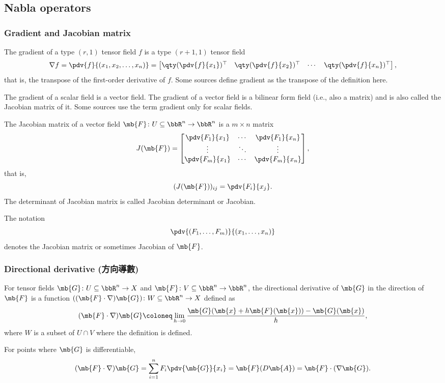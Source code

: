 \documentclass[a4paper,12pt]{report}
\begin{document}
\begin{itemize}
\begin{itemize}
\subsection{Nabla operators}
\subsubsection{Gradient and Jacobian matrix}
The gradient of a type $(r,1)$ tensor field $f$ is a type $(r+1,1)$ tensor field
\[\nabla f = \pdv{f}{(x_1,x_2,\ldots,x_n)} = \begin{bmatrix}\qty(\pdv{f}{x_1})^{\top} & \qty(\pdv{f}{x_2})^{\top} & \cdots  & \qty(\pdv{f}{x_n})^{\top}\end{bmatrix},\]
that is, the transpose of the first-order derivative of $f$. Some sources define gradient as the transpose of the definition here.

The gradient of a scalar field is a vector field. The gradient of a vector field is a bilinear form field (i.e., also a matrix) and is also called the Jacobian matrix of it. Some sources use the term gradient only for scalar fields.

The Jacobian matrix of a vector field $\mb{F}\colon U\subseteq\bbR^n\to\bbR^n$ is a $m\times n$ matrix
\[J(\mb{F})=\begin{bmatrix}
\pdv{F_1}{x_1} & \cdots & \pdv{F_1}{x_n}\\
\vdots & \ddots & \vdots\\
\pdv{F_m}{x_1} & \cdots & \pdv{F_m}{x_n}
\end{bmatrix},\]
that is,
\[(J(\mb{F}))_{ij}=\pdv{F_i}{x_j}.\]
The determinant of Jacobian matrix is called Jacobian determinant or Jacobian.

The notation
\[\pdv{(F_1,\ldots,F_m)}{(x_1,\ldots,x_n)}\]
denotes the Jacobian matrix or sometimes Jacobian of $\mb{F}$.
\subsubsection{Directional derivative (方向導數)}
For tensor fields $\mb{G}\colon U\subseteq\bbR^n\to X$ and $\mb{F}\colon V\subseteq\bbR^n\to\bbR^n$, the directional derivative of $\mb{G}$ in the direction of $\mb{F}$ is a function $((\mb{F}\cdot\nabla)\mb{G})\colon W\subseteq\bbR^n\to X$ defined as
\[(\mb{F}\cdot\nabla)\mb{G}\coloneq\lim_{h\to 0}\frac{\mb{G}(\mb{x}+h\mb{F}(\mb{x}))-\mb{G}(\mb{x})}{h},\]
where $W$ is a subset of $U\cap V$ where the definition is defined.

For points where $\mb{G}$ is differentiable,
\[(\mb{F}\cdot\nabla)\mb{G}=\sum_{i=1}^nF_i\pdv{\mb{G}}{x_i}=\mb{F}(D\mb{A})=\mb{F}\cdot(\nabla\mb{G}).\]

\end{itemize}
\end{itemize}
\end{document}
